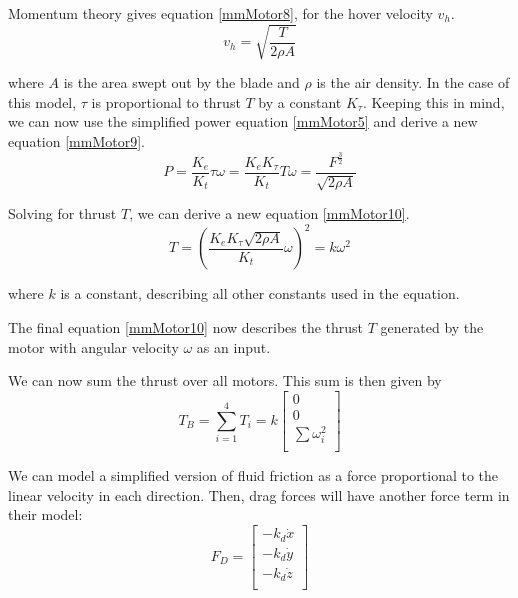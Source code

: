Momentum theory gives equation \ref{mmMotor8}, for the hover velocity $v_h$.
\begin{equation}
\label{mmMotor8}
	v_h = \sqrt{\frac{T}{2\rho A}}
\end{equation}

where $A$ is the area swept out by the blade and $\rho$ is the air density.
In the case of this model, $\tau$ is proportional to thrust $T$ by a constant $K_\tau$. Keeping this in mind, we can now use the simplified power equation \ref{mmMotor5} and derive a new equation \ref{mmMotor9}.
\begin{equation}
\label{mmMotor9}
 	P = \frac{K_e}{K_t}\tau \omega = \frac{K_eK_\tau }{K_t}T\omega = \frac{F^{\frac{3}{2}}} {\sqrt{2\rho A}}
\end{equation}

Solving for thrust $T$, we can derive a new equation \ref{mmMotor10}.
\begin{equation}
\label{mmMotor10}
 	T = (\frac{K_eK_\tau \sqrt{2\rho A}}{K_t}\omega)^2 = k\omega ^2
\end{equation}

where $k$ is a constant, describing all other constants used in the equation.

The final equation \ref{mmMotor10} now describes the thrust $T$ generated by the motor with angular velocity $\omega$ as an input.

We can now sum the thrust over all motors. This sum is then given by
\begin{equation}
\label{mmMotor11}
 	T_B = \displaystyle\sum_{i=1}^{4} T_i = k 	
 	\begin{bmatrix}
 	0 					\\
 	0 					\\
 	\sum \omega _i^2	\\ 
 	\end{bmatrix}	
\end{equation}

We can model a simplified version of fluid friction as a force proportional to the linear velocity in each direction. Then, drag forces will have another force term in their model:
\begin{equation}
\label{mmMotor12}
 	F_D = \begin{bmatrix}
 	-k_d\dot{x}	\\
 	-k_d\dot{y} \\
 	-k_d\dot{z} \\ 
 	\end{bmatrix}	
\end{equation}

